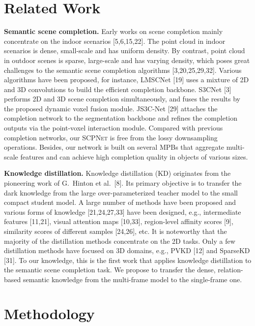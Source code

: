 \documentclass[10pt,twocolumn,letterpaper]{article}
\newcommand{\methodname}{\textsc{SCPNet}}
\begin{document}
\section{Related Work}

\textbf{Semantic scene completion.}
Early works on scene completion mainly concentrate on the indoor scenarios [5,6,15,22]. The point cloud in indoor scenarios is dense, small-scale and has uniform density. By contrast, point cloud in outdoor scenes is sparse, large-scale and has varying density, which poses great challenges to the semantic scene completion algorithms [3,20,25,29,32]. Various algorithms have been proposed, for instance, LMSCNet [19] uses a mixture of 2D and 3D convolutions to build the efficient completion backbone. S3CNet [3] performs 2D and 3D scene completion simultaneously, and fuses the results by the proposed dynamic voxel fusion module. JS3C-Net [29] attaches the completion network to the segmentation backbone and refines the completion outputs via the point-voxel interaction module. Compared with previous completion networks, our \methodname{} is free from the lossy downsampling operations. Besides, our network is built on several MPBs that aggregate multi-scale features and can achieve high completion quality in objects of various sizes.

\textbf{Knowledge distillation.}
Knowledge distillation (KD) originates from the pioneering work of G.\ Hinton et al.\ [8]. Its primary objective is to transfer the dark knowledge from the large over-parameterized teacher model to the small compact student model. A large number of methods have been proposed and various forms of knowledge [21,24,27,33] have been designed, e.g., intermediate features [11,21], visual attention maps [10,33], region-level affinity scores [9], similarity scores of different samples [24,26], etc. It is noteworthy that the majority of the distillation methods concentrate on the 2D tasks. Only a few distillation methods have focused on 3D domains, e.g., PVKD [12] and SparseKD [31]. To our knowledge, this is the first work that applies knowledge distillation to the semantic scene completion task. We propose to transfer the dense, relation-based semantic knowledge from the multi-frame model to the single-frame one.


\section{Methodology}
\end{document}
